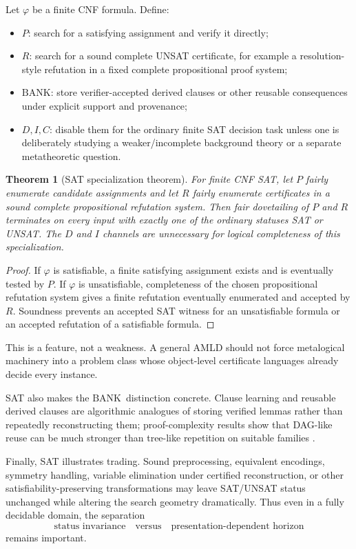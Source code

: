 \documentclass[11pt]{article}
\newtheorem{theorem}[definition]{Theorem}
\theoremstyle{remark}
\newcommand{\BANK}{\ensuremath{\mathrm{BANK}}}
\begin{document}
Let $\varphi$ be a finite CNF formula. Define:
\begin{itemize}
\item $P$: search for a satisfying assignment and verify it directly;
\item $R$: search for a sound complete UNSAT certificate, for example a resolution-style refutation in a fixed complete propositional proof system;
\item \BANK: store verifier-accepted derived clauses or other reusable consequences under explicit support and provenance;
\item $D,I,C$: disable them for the ordinary finite SAT decision task unless one is deliberately studying a weaker/incomplete background theory or a separate metatheoretic question.
\end{itemize}

\begin{theorem}[SAT specialization theorem]
For finite CNF SAT, let $P$ fairly enumerate candidate assignments and let $R$ fairly enumerate certificates in a sound complete propositional refutation system. Then fair dovetailing of $P$ and $R$ terminates on every input with exactly one of the ordinary statuses SAT or UNSAT. The $D$ and $I$ channels are unnecessary for logical completeness of this specialization.
\end{theorem}

\begin{proof}
If $\varphi$ is satisfiable, a finite satisfying assignment exists and is eventually tested by $P$. If $\varphi$ is unsatisfiable, completeness of the chosen propositional refutation system gives a finite refutation eventually enumerated and accepted by $R$. Soundness prevents an accepted SAT witness for an unsatisfiable formula or an accepted refutation of a satisfiable formula.
\end{proof}

This is a feature, not a weakness. A general AMLD should not force metalogical machinery into a problem class whose object-level certificate languages already decide every instance.

SAT also makes the \BANK\ distinction concrete. Clause learning and reusable derived clauses are algorithmic analogues of storing verified lemmas rather than repeatedly reconstructing them; proof-complexity results show that DAG-like reuse can be much stronger than tree-like repetition on suitable families \cite{biw,bks,bhj}.

Finally, SAT illustrates trading. Sound preprocessing, equivalent encodings, symmetry handling, variable elimination under certified reconstruction, or other satisfiability-preserving transformations may leave SAT/UNSAT status unchanged while altering the search geometry dramatically. Thus even in a fully decidable domain, the separation
\[
\text{status invariance}\quad\text{versus}\quad\text{presentation-dependent horizon}
\]
remains important.
\end{document}

